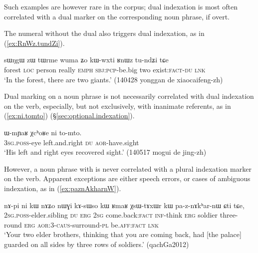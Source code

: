 Such examples are however rare in the corpus; dual indexation is most often correlated with a dual marker on the corresponding noun phrase, if overt.

The numeral  without the dual also triggers dual indexation, as in (\ref{ex:RnWz.tundZi}).

\begin{exe}
\ex \label{ex:RnWz.tundZi}
\gll   sɯŋgɯ zɯ tɯrme wuma ʑo kɯ-wxti ʁnɯz tu-ndʑi tɕe\\
forest \textsc{loc} person really \textsc{emph} \textsc{sbj}:\textsc{pcp}-be.big two exist:\textsc{fact}-\textsc{du} \textsc{lnk}\\
\glt `In the forest, there are two giants.'  (140428 yonggan de xiaocaifeng-zh)
\end{exe}

Dual marking on a noun phrase is not necessarily correlated with dual indexation on the verb, especially, but not exclusively, with inanimate referents, as in (\ref{ex:ni.tomto}) (§\ref{sec:optional.indexation}).

\begin{exe}
\ex \label{ex:ni.tomto}
\gll  ɯ-mɲaʁ χcʰoʁe ni to-mto. \\
\textsc{3sg}.\textsc{poss}-eye left.and.right \textsc{du} \textsc{aor}-have.sight \\
\glt `His left and right eyes recovered sight.' (140517 mogui de jing-zh) 
\end{exe}

However, a noun phrase with  is never correlated with a plural indexation marker on the verb. Apparent exceptions are either speech errors, or cases of ambiguous indexation, as in (\ref{ex:paznAkharnW}).

\begin{exe}
\ex \label{ex:paznAkharnW}
 \gll  nɤ-pi ni kɯ nɤʑo nɯɣi kɤ-sɯso kɯ ʁmaʁ χsɯ-tɤxɯr kɯ pa-z-nɤkʰar-nɯ ɕti tɕe, \\
 \textsc{2sg}.\textsc{poss}-elder.sibling \textsc{du} \textsc{erg} \textsc{2sg} come.back:\textsc{fact} \textsc{inf}-think \textsc{erg} soldier three-round \textsc{erg} \textsc{aor}:3\flobv{}-\textsc{caus}-surround-\textsc{pl} be.\textsc{aff}:\textsc{fact} \textsc{lnk} \\
 \glt `Your two elder brothers, thinking that you are coming back, had [the palace] guarded on all sides by three rows of soldiers.' (qachGa2012)
\end{exe}

